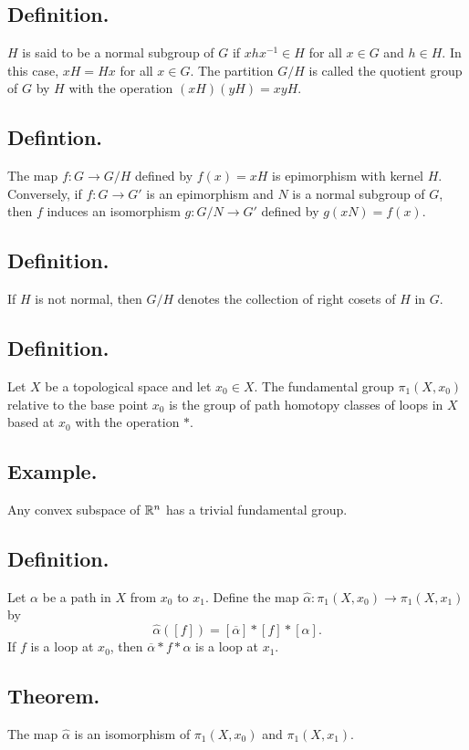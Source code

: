 \documentclass[titlepage]{article}
\begin{document}
\subsection{Definition.} $H$ is said to be a normal subgroup of $G$ if $xhx^{-1} \in H$ for all $x \in G$ and $h \in H$. In this case, $xH = Hx$ for all $x \in G$. The partition $G/H$ is called the quotient group of $G$ by $H$ with the operation $(xH)(yH) = xyH.$

\subsection{Defintion.} The map $f: G \to G/H$ defined by $f(x) = xH$ is epimorphism with kernel $H$. Conversely, if $f: G \to G'$ is an epimorphism and $N$ is a normal subgroup of $G$, then $f$ induces an isomorphism $g: G/N \to G'$ defined by $g(xN) = f(x)$.

\subsection{Definition.} If $H$ is not normal, then $G/H$ denotes the collection of right cosets of $H$ in $G$.

\subsection{Definition.} Let $X$ be a topological space and let $x_{0} \in X$. The fundamental group $\pi_{1}(X, x_{0})$ relative to the base point $x_{0}$ is the group of path homotopy classes of loops in $X$ based at $x_{0}$ with the operation $*$.

\subsection{Example.} Any convex subspace of $\mathbb{R}^{n}$ has a trivial fundamental group.

\subsection{Definition.} Let $\alpha$ be a path in $X$ from $x_{0}$ to $x_{1}$. Define the map $\hat{\alpha}: \pi_{1}(X, x_{0}) \to \pi_{1}(X, x_{1})$
by 
$$\hat{\alpha}([f]) = [\overline{\alpha}] * [f] * [\alpha].$$
If $f$ is a loop at $x_{0}$, then $\overline{\alpha} * f * \alpha$ is a loop at $x_{1}$.

\subsection{Theorem.} The map $\hat{\alpha}$ is an isomorphism of $\pi_{1}(X, x_{0})$ and $\pi_{1}(X, x_{1})$.
\end{document}
